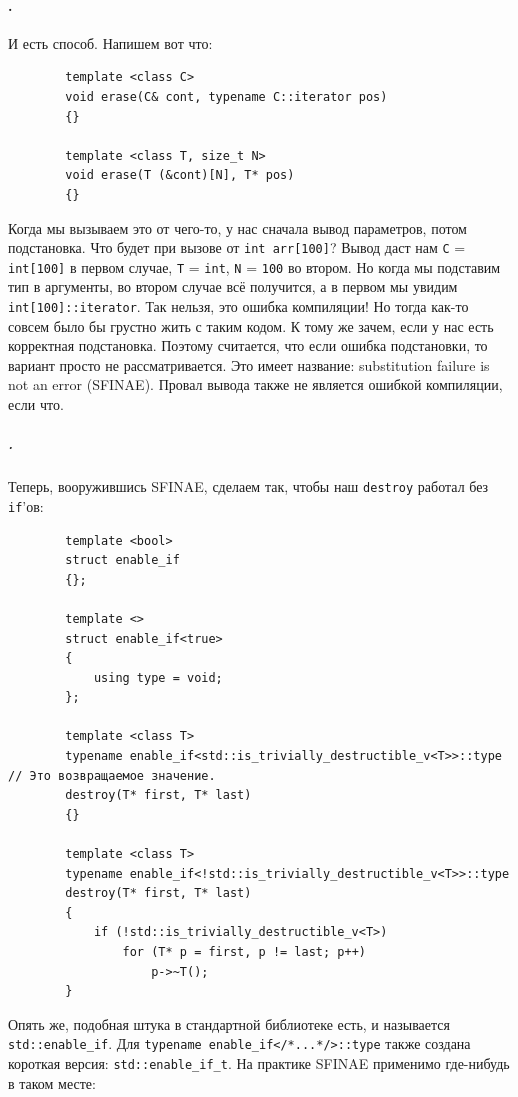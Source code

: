 \documentclass{article}
\begin{document}
    \paragraph{.}
    И есть способ. Напишем вот что:
    \begin{verbatim}
        template <class C>
        void erase(C& cont, typename C::iterator pos)
        {}

        template <class T, size_t N>
        void erase(T (&cont)[N], T* pos)
        {}
    \end{verbatim}
    Когда мы вызываем это от чего-то, у нас сначала вывод параметров, потом подстановка. Что будет при вызове от \texttt{int arr[100]}? Вывод даст нам \texttt{C} = \texttt{int[100]} в первом случае, \texttt{T} = \texttt{int}, \texttt{N} = \texttt{100} во втором. Но когда мы подставим тип в аргументы, во втором случае всё получится, а в первом мы увидим \texttt{int[100]::iterator}. Так нельзя, это ошибка компиляции! Но тогда как-то совсем было бы грустно жить с таким кодом. К тому же зачем, если у нас есть корректная подстановка. Поэтому считается, что если ошибка подстановки, то вариант просто не рассматривается. Это имеет название: substitution failure is not an error (SFINAE). Провал вывода также не является ошибкой компиляции, если что.
    \subparagraph{.}
    Теперь, вооружившись SFINAE, сделаем так, чтобы наш \texttt{destroy} работал без \texttt{if}'ов:
    \begin{verbatim}
        template <bool>
        struct enable_if
        {};

        template <>
        struct enable_if<true>
        {
            using type = void;
        };

        template <class T>
        typename enable_if<std::is_trivially_destructible_v<T>>::type // Это возвращаемое значение.
        destroy(T* first, T* last)
        {}

        template <class T>
        typename enable_if<!std::is_trivially_destructible_v<T>>::type
        destroy(T* first, T* last)
        {
            if (!std::is_trivially_destructible_v<T>)
                for (T* p = first, p != last; p++)
                    p->~T();
        }
    \end{verbatim}
    Опять же, подобная штука в стандартной библиотеке есть, и называется \texttt{std::enable_if}. Для \texttt{typename enable_if</*...*/>::type} также создана короткая версия: \texttt{std::enable_if_t}. На практике SFINAE применимо где-нибудь в таком месте:
\end{document}

